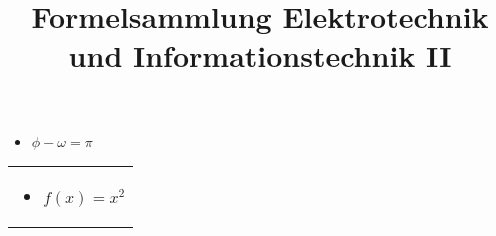 \documentclass{scrartcl}
\begin{document}
	\title{Formelsammlung Elektrotechnik und Informationstechnik II}
	\date{}
	\author{}
	\maketitle
	
\begin{minipage}{0,45 \textwidth}
	\begin{itemize}
		\item $\phi - \omega = \pi$
	\end{itemize}
\end{minipage}%
\hfill
\begin{minipage}{0,45 \textwidth}
	\begin{tabular}{|p{\textwidth}}
		\begin{itemize}
			\item $f(x) = x^2$
		\end{itemize}
		
	\end{tabular}
\end{minipage}%
\end{document}
